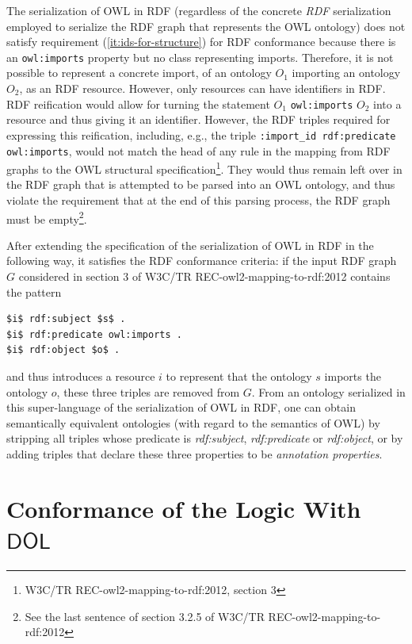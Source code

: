\documentclass[10pt,fleqn,final]{scrreprt}
\newcommand{\cbs}[0]{\xspace}
\newcommand{\cbe}[0]{\xspace}
\newcommand*{\DOL}{\ensuremath{\mathsf{DOL}}\xspace}
\newcommand{\nisref}[1]{#1}
\newenvironment{definitions}[0]{\medskip }{}
\begin{document}
\begin{definitions}
The serialization of OWL in RDF (regardless of the concrete \emph{RDF} serialization employed to serialize the RDF graph that represents the OWL ontology) does not satisfy \cbs{}requirement (\ref{it:ids-for-structure}) for RDF conformance because\cbe{} there is an \texttt{owl:imports} property but no class representing imports. 
Therefore, it is not possible to represent a concrete import, of an ontology $O_1$ importing an ontology $O_2$, as an RDF resource.
However, only resources can have identifiers in RDF.
RDF reification would allow for turning the statement $O_1$ \texttt{owl:imports} $O_2$ into a resource and thus giving it an identifier. 
However, the RDF triples required for expressing this reification, including, e.g., the triple \texttt{:import\_id rdf:predicate owl:imports},  would not match the head of any rule in the mapping from RDF graphs to the OWL structural specification\footnote{\nisref{W3C/TR REC-owl2-mapping-to-rdf:2012}, section 3}. 
They would thus remain left over in the RDF graph that is attempted to be parsed into an OWL ontology, and thus violate the requirement that at the end of this parsing process, the RDF graph must be empty\footnote{See the last sentence of section 3.2.5 of \nisref{W3C/TR REC-owl2-mapping-to-rdf:2012}}.

After extending the specification of the serialization of OWL in RDF in the following way, it satisfies the RDF conformance criteria: if the input RDF graph $G$ considered in section 3 of \nisref{W3C/TR REC-owl2-mapping-to-rdf:2012} contains the pattern

\begin{lstlisting}[basicstyle=\small\ttfamily,language=N3,mathescape]
$i$ rdf:subject $s$ .
$i$ rdf:predicate owl:imports .
$i$ rdf:object $o$ .
\end{lstlisting}

and thus introduces a resource $i$ to represent that the ontology $s$ imports the ontology $o$, these three triples are removed from $G$.
From an ontology serialized in this super-language of the serialization of OWL in RDF, one can obtain semantically equivalent ontologies (with regard to the semantics of OWL) by stripping all triples whose predicate is \textit{rdf:subject}, \textit{rdf:predicate} or \textit{rdf:object}, or by adding triples that declare these three properties to be \emph{annotation properties}.

\section{Conformance of the \SROIQ Logic With \DOL}\label{a:owl-logic}


\end{definitions}
\end{document}
